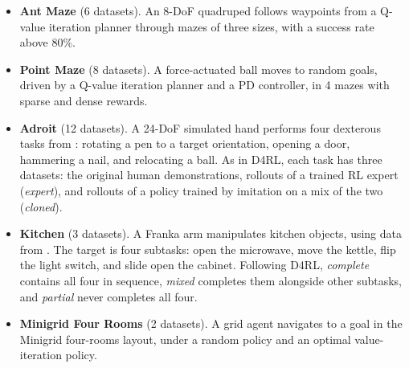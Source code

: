 \documentclass{article}
\begin{document}
\begin{itemize}
    \item \textbf{Ant Maze} (6 datasets). An 8-DoF quadruped follows waypoints from a Q-value iteration planner through mazes of three sizes, with a success rate above 80\%.
    \item \textbf{Point Maze} (8 datasets). A force-actuated ball moves to random goals, driven by a Q-value iteration planner and a PD controller, in 4 mazes with sparse and dense rewards.
    \item \textbf{Adroit} (12 datasets). A 24-DoF simulated hand performs four dexterous tasks from \citet{d4rl-pen}: rotating a pen to a target orientation, opening a door, hammering a nail, and relocating a ball. As in D4RL, each task has three datasets: the original human demonstrations, rollouts of a trained RL expert (\textit{expert}), and rollouts of a policy trained by imitation on a mix of the two (\textit{cloned}).
    \item \textbf{Kitchen} (3 datasets). A Franka arm manipulates kitchen objects, using data from \citet{relaypolicylearning}. The target is four subtasks: open the microwave, move the kettle, flip the light switch, and slide open the cabinet. Following D4RL, \textit{complete} contains all four in sequence, \textit{mixed} completes them alongside other subtasks, and \textit{partial} never completes all four.
    \item \textbf{Minigrid Four Rooms} (2 datasets). A grid agent navigates to a goal in the Minigrid \citep{minigrid} four-rooms layout, under a random policy and an optimal value-iteration policy.
\end{itemize}
\end{document}
